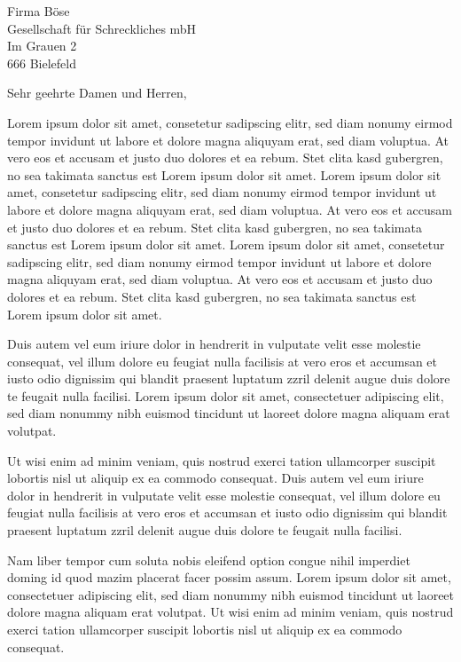 \documentclass[%
   fontsize=10pt,%
   paper=a4,%
   enlargefirstpage=on,%
   pagenumber=headright,%
   headsepline=on,%
   parskip=half,%
   fromalign=right,%
   fromphone=on,%
   fromrule=off,%
   fromfax=off,%
   fromemail=on,%
   fromurl=on,%
   fromlogo=on,%
   addrfield=on,%
   backaddress=on,%
   subject=beforeopening,%
   locfield=wide,%
   foldmarks=on,%
   numericaldate=off,%
   refline=narrow,%
   draft=false%
]{scrlttr2}
\renewcommand*{\familydefault}{\ttdefault}
\begin{document}
 \begin{letter}{Firma Böse
\\ Gesellschaft für Schreckliches mbH
\\ Im Grauen 2
\\ 666 Bielefeld}

\opening{Sehr geehrte Damen und Herren,}
\renewcommand*{\familydefault}{\ttdefault}

Lorem ipsum dolor sit amet, consetetur sadipscing elitr, sed diam nonumy eirmod tempor invidunt ut labore et dolore magna aliquyam erat, sed diam voluptua. At vero eos et accusam et justo duo dolores et ea rebum. Stet clita kasd gubergren, no sea takimata sanctus est Lorem ipsum dolor sit amet. Lorem ipsum dolor sit amet, consetetur sadipscing elitr, sed diam nonumy eirmod tempor invidunt ut labore et dolore magna aliquyam erat, sed diam voluptua. At vero eos et accusam et justo duo dolores et ea rebum. Stet clita kasd gubergren, no sea takimata sanctus est Lorem ipsum dolor sit amet. Lorem ipsum dolor sit amet, consetetur sadipscing elitr, sed diam nonumy eirmod tempor invidunt ut labore et dolore magna aliquyam erat, sed diam voluptua. At vero eos et accusam et justo duo dolores et ea rebum. Stet clita kasd gubergren, no sea takimata sanctus est Lorem ipsum dolor sit amet.

Duis autem vel eum iriure dolor in hendrerit in vulputate velit esse molestie consequat, vel illum dolore eu feugiat nulla facilisis at vero eros et accumsan et iusto odio dignissim qui blandit praesent luptatum zzril delenit augue duis dolore te feugait nulla facilisi. Lorem ipsum dolor sit amet, consectetuer adipiscing elit, sed diam nonummy nibh euismod tincidunt ut laoreet dolore magna aliquam erat volutpat.

Ut wisi enim ad minim veniam, quis nostrud exerci tation ullamcorper suscipit lobortis nisl ut aliquip ex ea commodo consequat. Duis autem vel eum iriure dolor in hendrerit in vulputate velit esse molestie consequat, vel illum dolore eu feugiat nulla facilisis at vero eros et accumsan et iusto odio dignissim qui blandit praesent luptatum zzril delenit augue duis dolore te feugait nulla facilisi.

Nam liber tempor cum soluta nobis eleifend option congue nihil imperdiet doming id quod mazim placerat facer possim assum. Lorem ipsum dolor sit amet, consectetuer adipiscing elit, sed diam nonummy nibh euismod tincidunt ut laoreet dolore magna aliquam erat volutpat. Ut wisi enim ad minim veniam, quis nostrud exerci tation ullamcorper suscipit lobortis nisl ut aliquip ex ea commodo consequat.


\end{letter}
\end{document}
